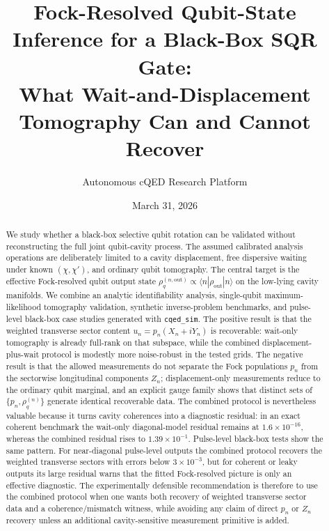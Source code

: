 \documentclass[11pt]{article}
\title{Fock-Resolved Qubit-State Inference for a Black-Box SQR Gate:\\
What Wait-and-Displacement Tomography Can and Cannot Recover}
\author{Autonomous cQED Research Platform}
\date{March 31, 2026}
\begin{document}
\maketitle

\begin{abstract}
We study whether a black-box selective qubit rotation can be validated without
reconstructing the full joint qubit-cavity process. The assumed calibrated
analysis operations are deliberately limited to a cavity displacement, free
dispersive waiting under known $(\chi,\chi')$, and ordinary qubit tomography.
The central target is the effective Fock-resolved qubit output state
$\rho_q^{(n,\mathrm{out})} \propto \langle n|\rho_{\mathrm{out}}|n\rangle$ on the
low-lying cavity manifolds. We combine an analytic identifiability analysis,
single-qubit maximum-likelihood tomography validation, synthetic inverse-problem
benchmarks, and pulse-level black-box case studies generated with
\texttt{cqed\_sim}. The positive result is that the weighted transverse sector
content $u_n = p_n (X_n + i Y_n)$ is recoverable: wait-only tomography is already
full-rank on that subspace, while the combined displacement-plus-wait protocol
is modestly more noise-robust in the tested grids. The negative result is that
the allowed measurements do not separate the Fock populations $p_n$ from the
sectorwise longitudinal components $Z_n$; displacement-only measurements reduce
to the ordinary qubit marginal, and an explicit gauge family shows that distinct
sets of $\{p_n,\rho_q^{(n)}\}$ generate identical recoverable data. The combined
protocol is nevertheless valuable because it turns cavity coherences into a
diagnostic residual: in an exact coherent benchmark the wait-only diagonal-model
residual remains at $1.6\times 10^{-16}$, whereas the combined residual rises to
$1.39\times 10^{-1}$. Pulse-level black-box tests show the same pattern. For
near-diagonal pulse-level outputs the combined protocol recovers the weighted
transverse sectors with errors below $3\times 10^{-3}$, but for coherent or
leaky outputs its large residual warns that the fitted Fock-resolved picture is
only an effective diagnostic. The experimentally defensible recommendation is
therefore to use the combined protocol when one wants both recovery of weighted
transverse sector data and a coherence/mismatch witness, while avoiding any
claim of direct $p_n$ or $Z_n$ recovery unless an additional cavity-sensitive
measurement primitive is added.
\end{abstract}
\end{document}
